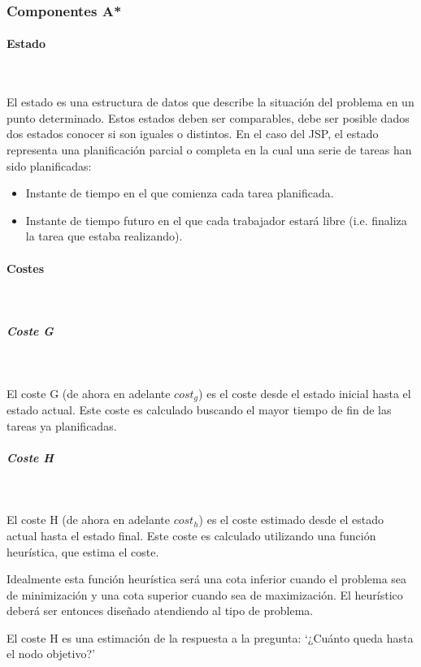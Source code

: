 \pagebreak

\subsubsection{Componentes A*}

\paragraph{Estado}~

El estado es una estructura de datos que describe la situación
del problema en un punto determinado.
Estos estados deben ser comparables,
debe ser posible dados dos estados conocer si son iguales o distintos.
En el caso del JSP, el estado representa una planificación parcial o completa
en la cual una serie de tareas han sido planificadas:
\begin{itemize}[itemsep=0.25px]
    \item Instante de tiempo en el que comienza cada tarea planificada.
    \item Instante de tiempo futuro en el que cada trabajador estará libre
    (i.e. finaliza la tarea que estaba realizando).
\end{itemize}

\paragraph{Costes}~

\subparagraph{Coste G}~

El coste G (de ahora en adelante $cost_g$) es el coste desde el estado inicial
hasta el estado actual.
Este coste es calculado buscando el mayor tiempo de fin de
las tareas ya planificadas.

\subparagraph{Coste H}~

El coste H (de ahora en adelante $cost_h$) es el coste estimado desde el estado actual
hasta el estado final.
Este coste es calculado utilizando una función heurística,
que estima el coste.

Idealmente esta función heurística será una cota inferior cuando el problema
sea de minimización y una cota superior cuando sea de maximización.
El heurístico deberá ser entonces diseñado atendiendo al tipo de problema.

\begin{keynotebox}
    El coste H es una estimación de la respuesta a la pregunta:
    `¿Cuánto queda hasta el nodo objetivo?'
\end{keynotebox}

